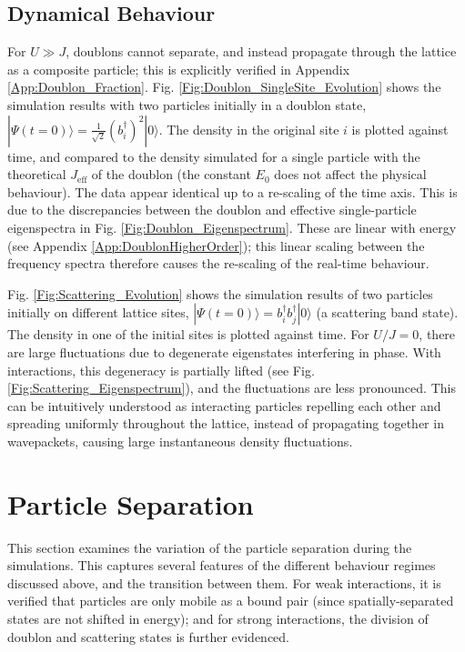\subsection{Dynamical Behaviour}\label{Sec:Strong_Interaction_Dynamics}

For $U\gg J$, doublons cannot separate, and instead propagate through the lattice as a composite particle; this is explicitly verified in Appendix \ref{App:Doublon_Fraction}. Fig. \ref{Fig:Doublon_SingleSite_Evolution} shows the simulation results with two particles initially in a doublon state, $|\Psi(t=0)\rangle=\frac{1}{\sqrt{2}}(b_{i}^{\dag})^2|0\rangle$. The density in the original site $i$ is plotted against time, and compared to the density simulated for a single particle with the theoretical $J_{\text{eff}}$ of the doublon (the constant $E_0$ does not affect the physical behaviour). The data appear identical up to a re-scaling of the time axis. This is due to the discrepancies between the doublon and effective single-particle eigenspectra in Fig. \ref{Fig:Doublon_Eigenspectrum}. These are linear with energy (see Appendix \ref{App:DoublonHigherOrder}); this linear scaling between the frequency spectra therefore causes the re-scaling of the real-time behaviour. 

Fig. \ref{Fig:Scattering_Evolution} shows the simulation results of two particles initially on different lattice sites, $|\Psi(t=0)\rangle=b_{i}^{\dag}b_{j}^{\dag}|0\rangle$ (a scattering band state). The density in one of the initial sites is plotted against time. For $U/J=0$, there are large fluctuations due to degenerate eigenstates interfering in phase. With interactions, this degeneracy is partially lifted (see Fig. \ref{Fig:Scattering_Eigenspectrum}), and the fluctuations are less pronounced. This can be intuitively understood as interacting particles repelling each other and spreading uniformly throughout the lattice, instead of propagating together in wavepackets, causing large instantaneous density fluctuations. 

\vspace{0.5cm}

\section{Particle Separation}\label{Sec:ParticleSeparation}

This section examines the variation of the particle separation during the simulations. This captures several features of the different behaviour regimes discussed above, and the transition between them. For weak interactions, it is verified that particles are only mobile as a bound pair (since spatially-separated states are not shifted in energy); and for strong interactions, the division of doublon and scattering states is further evidenced.

